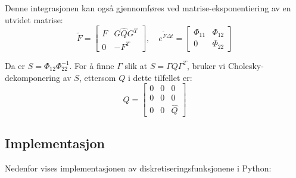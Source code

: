 \documentclass[a4paper,12pt]{article}
\theoremstyle{plain}
\begin{document}
Denne integrasjonen kan også gjennomføres ved matrise-eksponentiering av en utvidet matrise:
\begin{equation}
\tilde{F} = \begin{bmatrix}
F & G\hat{Q}G^T \\
0 & -F^T
\end{bmatrix}, \quad
e^{\tilde{F} \Delta t} = \begin{bmatrix}
\Phi_{11} & \Phi_{12} \\
0 & \Phi_{22}
\end{bmatrix}
\end{equation}

Da er $S = \Phi_{12}\Phi_{22}^{-1}$. For å finne $\Gamma$ slik at $S = \Gamma Q \Gamma^T$, bruker vi Cholesky-dekomponering av $S$, ettersom $Q$ i dette tilfellet er:
\begin{equation}
Q = \begin{bmatrix}
0 & 0 & 0 \\
0 & 0 & 0 \\
0 & 0 & \hat{Q}
\end{bmatrix}
\end{equation}

\subsection{Implementasjon}
Nedenfor vises implementasjonen av diskretiseringsfunksjonene i Python:
\end{document}
